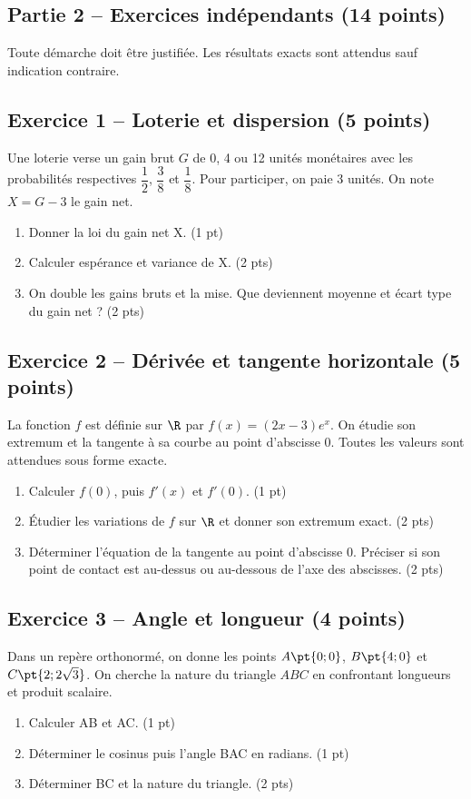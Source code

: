 \mxnewpage\subsection*{Partie 2 -- Exercices indépendants (14 points)}
Toute démarche doit être justifiée. Les résultats exacts sont attendus sauf indication contraire.
\subsection*{Exercice 1 -- Loterie et dispersion (5 points)}
Une loterie verse un gain brut $G$ de 0, 4 ou 12 unités monétaires avec les probabilités respectives $\dfrac12$, $\dfrac38$ et $\dfrac18$. Pour participer, on paie 3 unités. On note $X=G-3$ le gain net.
\begin{enumerate}
\item Donner la loi du gain net X. \hfill(1 pt)
\item Calculer espérance et variance de X. \hfill(2 pts)
\item On double les gains bruts et la mise. Que deviennent moyenne et écart type du gain net ? \hfill(2 pts)
\end{enumerate}
\subsection*{Exercice 2 -- Dérivée et tangente horizontale (5 points)}
La fonction $f$ est définie sur $\R$ par $f(x)=(2x-3)e^x$. On étudie son extremum et la tangente à sa courbe au point d’abscisse 0. Toutes les valeurs sont attendues sous forme exacte.
\begin{enumerate}
\item Calculer $f(0)$, puis $f\prime(x)$ et $f\prime(0)$. \hfill(1 pt)
\item Étudier les variations de $f$ sur $\R$ et donner son extremum exact. \hfill(2 pts)
\item Déterminer l’équation de la tangente au point d’abscisse 0. Préciser si son point de contact est au-dessus ou au-dessous de l’axe des abscisses. \hfill(2 pts)
\end{enumerate}
\subsection*{Exercice 3 -- Angle et longueur (4 points)}
Dans un repère orthonormé, on donne les points $A\pt{0;0}$, $B\pt{4;0}$ et $C\pt{2;2\sqrt3}$. On cherche la nature du triangle $ABC$ en confrontant longueurs et produit scalaire.
\begin{enumerate}
\item Calculer AB et AC. \hfill(1 pt)
\item Déterminer le cosinus puis l’angle BAC en radians. \hfill(1 pt)
\item Déterminer BC et la nature du triangle. \hfill(2 pts)
\end{enumerate}
